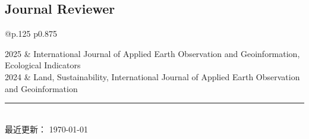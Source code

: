 \documentclass[11pt]{article}
\begin{document}
\subsection*{Journal Reviewer}

\begin{longtable}[l]{@{}p{.125\textwidth} p{0.875\textwidth}}

	2025 & International Journal of Applied Earth Observation and Geoinformation, Ecological Indicators \\
	2024 & Land, Sustainability, International Journal of Applied Earth Observation and Geoinformation  \\
\end{longtable}

\centering
\rule{0.25\linewidth}{0.4pt}\\
\medskip
最近更新： \today
\end{document}

